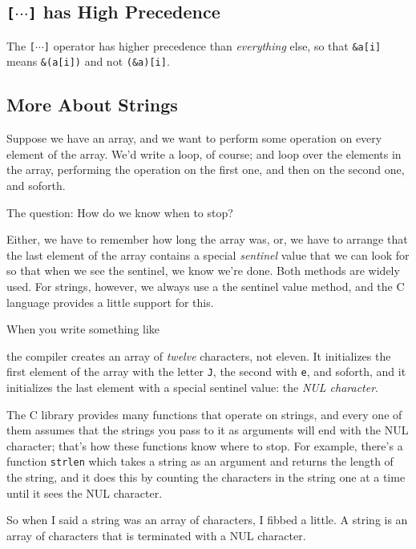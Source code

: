 \subsection{{\tt[$\cdots$]} has High Precedence}

The {\tt[{$\cdots$}]} operator has higher precedence than {\em
everything}\/ else, so that {\tt\&a[i]} means {\tt\&(a[i])} and not
{\tt(\&a)[i]}. 

\subsection{More About Strings}

Suppose we have an array, and we want to perform some operation on every
element of the array.  We'd write a loop, of course; and loop over the
elements in the array, performing the operation on the first one, and
then on the second one, and soforth.

The question:  How do we know when to stop?

Either, we have to remember how long the array was, or, we have to
arrange that the last element of the array contains a special {\em
sentinel}\/ value that we can look for so that when we see the sentinel,
we know we're done.  Both methods are widely used.  For strings,
however, we always use a the sentinel value method, and the C language
provides a little support for this.

When you write something like

\begin{flushleft}
\verb% char name[] = "Jean Ogrinz"; %  
\end{flushleft}

\noindent the compiler creates an array of {\em twelve}\/ characters,
not eleven.  It initializes the first element of the array with the
letter {\tt J}, the second with {\tt e}, and soforth, and it initializes
the last element with a special sentinel value: the {\em NUL character}.

The C library provides many functions that operate on strings, and every
one of them assumes that the strings you pass to it as arguments will
end with the NUL character; that's how these functions know where to
stop.  For example, there's a function {\tt strlen} which takes a string
as an argument and returns the length of the string, and it does this by
counting the characters in the string one at a time until it sees the
NUL character.

So when I said a string was an array of characters, I fibbed a little.
A string is an array of characters that is terminated with a NUL
character.

